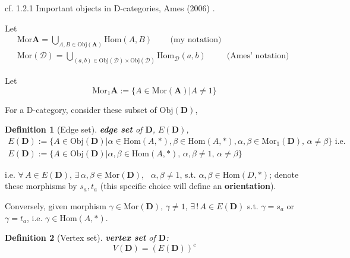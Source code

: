 \documentclass[10pt]{amsart}
\newtheorem{definition}{Definition}
\begin{document}
\begin{multicols*}{2}
cf. 1.2.1 Important objects in D-categories, Ames (2006) \cite{Ames2006}.

Let 
\[
\begin{gathered}
	\text{Mor}{\mathbf{A}} = \bigcup_{A, B \in \text{Obj}(\mathbf{A})} \text{Hom}(A,B) \qquad \, \text{(my notation)} \\
	\text{Mor}(\mathcal{D}) = \bigcup_{(a,b) \in \text{Obj}(\mathcal{D}) \times \text{Obj}(\mathcal{D}) } \text{Hom}_{\mathcal{D}}(a,b) \qquad \, \text{ (Ames' notation) }
\end{gathered}
\]	
	
Let 
\begin{equation}
\text{Mor}_{1}{\mathbf{A}} := \lbrace A \in \text{Mor}(\mathbf{A}) | A \neq 1 \rbrace 
\end{equation}

For a D-category, consider these subset of $\text{Obj}(\mathbf{D})$, 

\begin{definition}[Edge set]
	\textbf{edge set} of $\mathbf{D}$, $E(\mathbf{D})$, 
\begin{equation}
\begin{gathered}
E(\mathbf{D}) := \lbrace A \in \text{Obj}(\mathbf{D}) | \alpha \in \text{Hom}(A, *), \beta \in \text{Hom}(A, *), \alpha, \beta \in \text{Mor}_{1}(\mathbf{D}), \, \alpha \neq \beta \rbrace \text{ i.e. } \\
E(\mathbf{D}) := \lbrace A \in \text{Obj}(\mathbf{D}) | \alpha, \beta \in \text{Hom}(A, *), \, \alpha, \beta \neq 1, \, \alpha \neq \beta \rbrace
\end{gathered}
\end{equation}	
\end{definition}
i.e. $\forall \, A \in E(\mathbf{D})$, $\exists \, \alpha, \beta \in \text{Mor}(\mathbf{D})$, \, $\alpha, \beta \neq 1$, s.t. $\alpha, \beta \in \text{Hom}(D, *)$; denote these morphisms by $s_a,t_a$ (this specific choice will define an \textbf{orientation}).

Conversely, given morphism $\gamma \in \text{Mor}(\mathbf{D})$, $\gamma \neq 1$, $\exists \, ! \, A \in E(\mathbf{D})$ s.t. $\gamma = s_a$ or $\gamma = t_a$, i.e. $\gamma \in \text{Hom}(A, *)$. 

\begin{definition}[Vertex set]
\textbf{vertex set} of $\mathbf{D}$:
\begin{equation}
 V(\mathbf{D}) = (E(\mathbf{D}))^c
\end{equation} 
\end{definition}


\end{multicols*}
\end{document}
